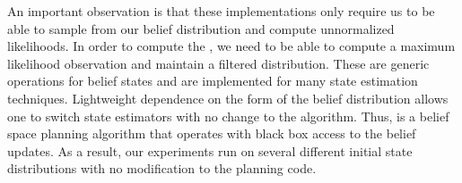 An important observation is that these implementations only require us
to be able to sample from our belief distribution and compute
unnormalized likelihoods. In order to compute the \mld{}, we need to
be able to compute a maximum likelihood observation and maintain a
filtered distribution. These are generic operations for belief states
and are implemented for many state estimation techniques. Lightweight
dependence on the form of the belief distribution allows one to switch
state estimators with no change to the algorithm. Thus, \ibsp{} is
a belief space planning algorithm that operates with black box access
to the belief updates. As a result, our experiments run on several
different initial state distributions with no modification to the
planning code.

